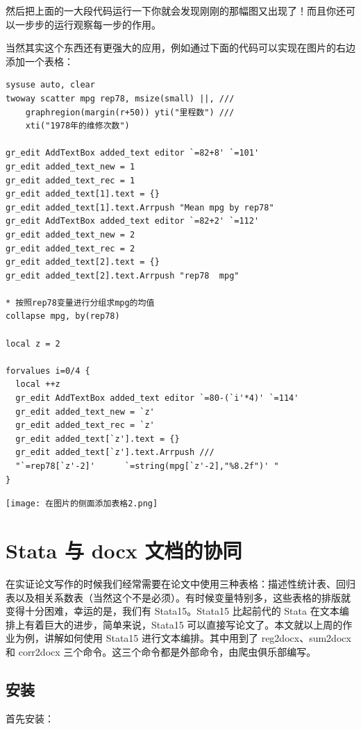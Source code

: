 \documentclass[cn,fancy,blue,11pt]{elegantbook}
\begin{document}
然后把上面的一大段代码运行一下你就会发现刚刚的那幅图又出现了！而且你还可以一步步的运行观察每一步的作用。

当然其实这个东西还有更强大的应用，例如通过下面的代码可以实现在图片的右边添加一个表格：

\begin{lstlisting}
sysuse auto, clear
twoway scatter mpg rep78, msize(small) ||, ///
    graphregion(margin(r+50)) yti("里程数") ///
    xti("1978年的维修次数")

gr_edit AddTextBox added_text editor `=82+8' `=101'
gr_edit added_text_new = 1
gr_edit added_text_rec = 1
gr_edit added_text[1].text = {}
gr_edit added_text[1].text.Arrpush "Mean mpg by rep78"
gr_edit AddTextBox added_text editor `=82+2' `=112'
gr_edit added_text_new = 2
gr_edit added_text_rec = 2
gr_edit added_text[2].text = {}
gr_edit added_text[2].text.Arrpush "rep78  mpg"

* 按照rep78变量进行分组求mpg的均值
collapse mpg, by(rep78)

local z = 2

forvalues i=0/4 {
  local ++z
  gr_edit AddTextBox added_text editor `=80-(`i'*4)' `=114'
  gr_edit added_text_new = `z'
  gr_edit added_text_rec = `z'
  gr_edit added_text[`z'].text = {}
  gr_edit added_text[`z'].text.Arrpush ///
  "`=rep78[`z'-2]'      `=string(mpg[`z'-2],"%8.2f")' "
}
\end{lstlisting}

\noindent\texttt{[image: 在图片的侧面添加表格2.png]}

\hypertarget{stata--docx-}{%
\chapter{Stata 与 docx 文档的协同}\label{stata--docx-}}

在实证论文写作的时候我们经常需要在论文中使用三种表格：描述性统计表、回归表以及相关系数表（当然这个不是必须）。有时候变量特别多，这些表格的排版就变得十分困难，幸运的是，我们有 Stata15。Stata15 比起前代的 Stata 在文本编排上有着巨大的进步，简单来说，Stata15 可以直接写论文了。本文就以上周的作业为例，讲解如何使用 Stata15 进行文本编排。其中用到了 reg2docx、sum2docx 和 corr2docx 三个命令。这三个命令都是外部命令，由爬虫俱乐部编写。

\hypertarget{section-40}{%
\section{安装}\label{section-40}}

首先安装：
\end{document}
